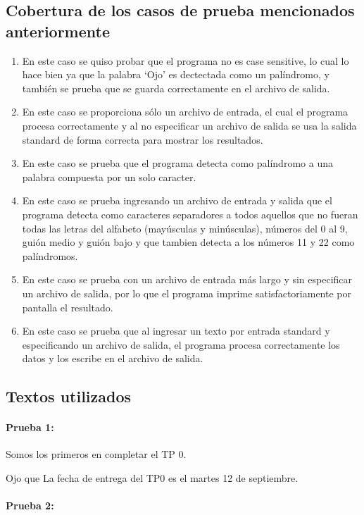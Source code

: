 \documentclass[a4paper]{article}
\begin{document}
\pagebreak

\subsection{Cobertura de los casos de prueba mencionados anteriormente}
\begin{enumerate}
\item En este caso se quiso probar que el programa no es case sensitive, lo cual lo hace bien ya que la palabra `Ojo' es dectectada como un palíndromo, y también se prueba que se guarda correctamente en el archivo de salida.
\item En este caso se proporciona sólo un archivo de entrada, el cual el programa procesa correctamente y al no especificar un archivo de salida se usa la salida standard de forma correcta para mostrar los resultados. 
\item En este caso se prueba que el programa detecta como palíndromo a una palabra compuesta por un solo caracter.
\item En este caso se prueba ingresando un archivo de entrada y salida que el programa detecta como caracteres separadores a todos aquellos que no fueran todas las letras del alfabeto (mayúsculas y minúsculas), números del 0 al 9, guión medio y guión bajo y que tambien detecta a los números 11 y 22 como palíndromos.
\item En este caso se prueba con un archivo de entrada más largo y sin especificar un archivo de salida, por lo que el programa imprime satisfactoriamente por pantalla el resultado.
\item En este caso se prueba que al ingresar un texto por entrada standard y especificando un archivo de salida, el programa procesa correctamente los datos y los escribe en el archivo de salida.
\end{enumerate}

\subsection{Textos utilizados}

\paragraph{Prueba 1:}

Somos los primeros en completar el TP 0.

Ojo que La fecha de entrega del TP0 es el martes 12 de septiembre.

\paragraph{Prueba 2:}
\end{document}
